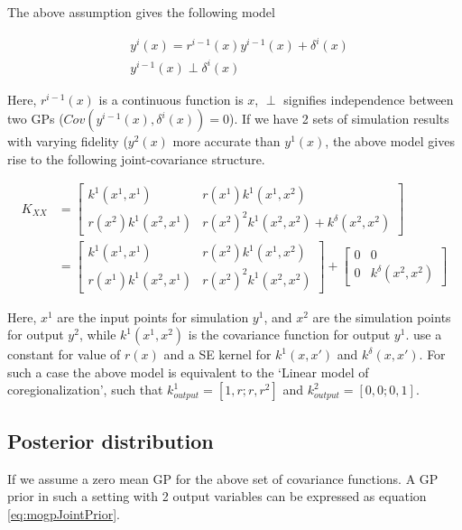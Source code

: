 The above assumption gives the following model

\begin{align}
  & y^{i}(x) = r^{i-1}(x)y^{i-1}(x) + \delta^{i}(x) \\
  & y^{i-1}(x) \perp \delta^{i}(x)
\end{align}

Here, $r^{i-1}(x)$ is a continuous function is $x$, $\perp$ signifies independence between two GPs ($Cov(y^{i-1}(x), \delta^{i}(x)) = 0$). If we have 2 sets of simulation results with varying fidelity ($y^{2}(x)$ more accurate than $y^{1}(x)$, the above model gives rise to the following joint-covariance structure.

\begin{equation}\label{eqJointCovarianceMultiFidelity}
         \begin{aligned}
           K_{XX}   & = \begin{bmatrix} k^{1}(x^{1}, x^{1}) & r(x^{1})k^{1}(x^{1}, x^{2})   \\
           r(x^{2})k^{1}(x^{2}, x^{1}) & r(x^{2})^2k^{1}(x^{2}, x^{2}) + k^{\delta}(x^{2}, x^{2}) \end{bmatrix} \\ 
           & = \begin{bmatrix} k^{1}(x^{1}, x^{1}) & r(x^{2})k^{1}(x^{1}, x^{2})   \\ r(x^{1})k^{1}(x^{2}, x^{1}) & r(x^{2})^2k^{1}(x^{2}, x^{2}) \end{bmatrix} 
           +  
\begin{bmatrix} 0 & 0 \\ 0 & k^{\delta}(x^{2}, x^{2}) \end{bmatrix} 
         \end{aligned}
\end{equation}

Here, $x^{1}$ are the input points for simulation $y^{1}$, and $x^{2}$ are the simulation points for output $y^{2}$, while $k^{1}(x^{1}, x^{2})$ is the covariance function for output $y^{1}$. \cite{kennedy2000predicting} use a constant for value of $r(x)$ and a SE kernel for $k^{1}(x, x')$ and $k^{\delta}(x, x')$.  For such a case the above model is equivalent to the `Linear model of coregionalization', such that $k_{output}^{1} = [1, r; r, r^2]$  and $k_{output}^{2} = [0, 0; 0, 1]$.

\subsection{Posterior distribution}\label{subsecPosteriorDistribution}
If we assume a zero mean GP for the above set of covariance functions. A GP prior in such a setting with 2 output variables can be expressed as equation \ref{eq:mogpJointPrior}.     

